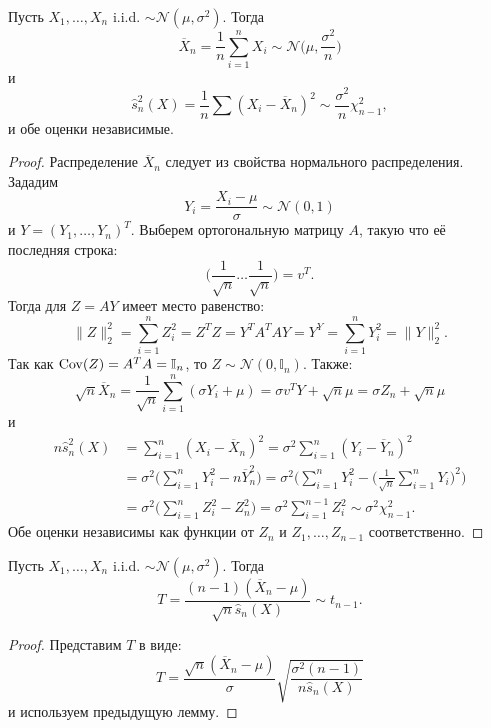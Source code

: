 \begin{lmm} \label{Distribution of estimators of Normal distribution}
	Пусть $X_1, \dots, X_n$ i.i.d. $\sim \mathcal{N}(\mu,\sigma^2)$. Тогда
	\[ \overline{X}_n=\frac{1}{n}\sum_{i=1}^n X_i \sim \mathcal{N}\Big(\mu,\frac{\sigma^2}{n}\Big) \]
	и
	\[ \hat{s}_n^2(X)=\frac{1}{n}\sum(X_i-\overline{X}_n)^2 \sim \frac{\sigma^2}{n}\chi_{n-1}^2,  \]
	и обе оценки независимые.
\end{lmm}
\begin{proof}
	Распределение $\overline{X}_n$ следует из свойства нормального распределения. Зададим
	\[ Y_i=\frac{X_i-\mu}{\sigma} \sim \mathcal{N}(0,1) \]
	и $Y=(Y_1, \dots, Y_n)^T$. Выберем ортогональную матрицу $A$, такую что её последняя строка:
	\[\bigg(\frac{1}{\sqrt{n}} \dots \frac{1}{\sqrt{n}}\bigg) = v^T.\]
	Тогда для $Z=AY$ имеет место равенство:
	\[ \|Z\|_2^2=\sum_{i=1}^nZ_i^2=Z^TZ=Y^TA^TAY=Y^Y=\sum_{i=1}^nY_i^2=\|Y\|_2^2.\]
	Так как $\operatorname{Cov}(Z)=A^TA=\mathbb{I}_n$, то $Z \sim \mathcal{N}(0, \mathbb{I}_n)$. Также:
	\[ \sqrt{n}\overline{X}_n=\frac{1}{\sqrt{n}}\sum_{i=1}^n(\sigma Y_i + \mu)=\sigma v^TY+\sqrt{n}\mu=\sigma Z_n+\sqrt{n}\mu \]
	и
	\[ \begin{aligned}
	n\hat{s}_n^2(X) & =\sum_{i=1}^n(X_i-\overline{X}_n)^2=\sigma^2\sum_{i=1}^n(Y_i-\overline{Y}_n)^2 \\
	& = \sigma^2\Big(\sum_{i=1}^nY_i^2-n\overline{Y}_n^2\Big) = \sigma^2 \Big(\sum_{i=1}^nY_i^2 - \Big( \frac{1}{\sqrt{n}}\sum_{i=1}^nY_i \Big)^2 \Big) \\
	& = \sigma^2\Big(\sum_{i=1}^n  Z_i^2-Z_n^2 \Big) = \sigma^2 \sum_{i=1}^{n-1} Z_i^2 \sim \sigma^2 \chi_{n-1}^2.
	\end{aligned} \] 
	Обе оценки независимы как функции от $Z_n$ и $Z_1, \dots, Z_{n-1}$ соответственно.
\end{proof}

\begin{crlr} \label{crlr2.21}
	Пусть $X_1, \dots, X_n$ i.i.d. $\sim \mathcal{N}(\mu,\sigma^2)$. Тогда
	\[ T=\frac{(n-1)(\overline{X}_n-\mu)}{\sqrt{n} \hat{s}_n(X)} \sim t_{n-1}. \]
\end{crlr}
\begin{proof}
	Представим $T$ в виде:
	\[ T= \frac{\sqrt{n}(\overline{X}_n-\mu)}{\sigma} \sqrt{\frac{\sigma^2 (n-1)}{n \hat{s}_n(X)}}\]
	и используем предыдущую лемму.
\end{proof}

